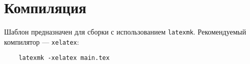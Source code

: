 \section{Компиляция}

Шаблон предназначен для сборки с использованием \texttt{latexmk}. Рекомендуемый компилятор --- \texttt{xelatex}:

\begin{verbatim}
	latexmk -xelatex main.tex
\end{verbatim}

\lipsum[1-2]